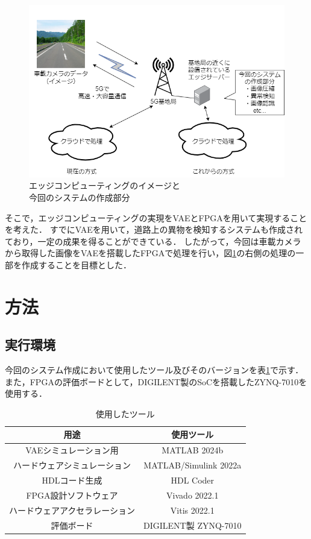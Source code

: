 \documentclass[paper]{ieicej}
\begin{document}
\begin{figure}[tb]
  \begin{center}
    \includegraphics[width=0.98\columnwidth]{figures/Intr_1.png}
  \end{center}
  \caption{エッジコンピューティングのイメージと\\今回のシステムの作成部分}
  \label{fig:1-1}
\end{figure}

そこで，エッジコンピューティングの実現をVAEとFPGAを用いて実現することを考えた．
すでにVAEを用いて，道路上の異物を検知するシステムも作成されており，一定の成果を得ることができている\cite{vae-raod}．%
したがって，今回は車載カメラから取得した画像をVAEを搭載したFPGAで処理を行い，図\ref{fig:1-1}の右側の処理の一部を作成することを目標とした．

\section{方法}
\subsection{実行環境}
今回のシステム作成において使用したツール及びそのバージョンを表\ref{tb:1}で示す．
また，FPGAの評価ボードとして，DIGILENT製のSoCを搭載したZYNQ-7010を使用する．

\begin{table}[tb]
  \centering
  \caption{使用したツール}
  \small
  \begin{tabular}{|c|c|} \hline
    用途 & 使用ツール \\ \hline \hline
    VAEシミュレーション用 & MATLAB 2024b \\ \hline
    ハードウェアシミュレーション & MATLAB/Simulink 2022a\\ \hline
    HDLコード生成 & HDL Coder \\ \hline
    FPGA設計ソフトウェア & Vivado 2022.1\\ \hline
    ハードウェアアクセラレーション & Vitis 2022.1 \\ \hline
    評価ボード & DIGILENT製 ZYNQ-7010 \\ \hline
  \end{tabular}
  \label{tb:1}
\end{table}
\end{document}

